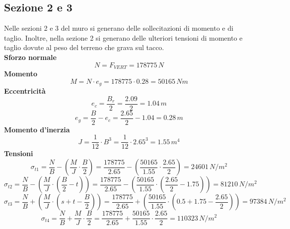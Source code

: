 \subsection{Sezione 2 e 3}
Nelle sezioni 2 e 3 del muro si generano delle sollecitazioni di momento e di taglio. Inoltre, nella sezione 2 si generano delle ulteriori tensioni di momento e taglio dovute al peso del terreno che grava sul tacco.\\
\textbf{Sforzo normale}
\begin{equation*}
    N = F_{VERT} = 178775 \,N
\end{equation*}
\textbf{Momento}
\begin{equation*}
    M = N \cdot e_g = 178775 \cdot 0.28 = 50165 \,Nm
\end{equation*}
\textbf{Eccentricità}
\begin{equation*}
    e_c = \frac{B_r}{2} = \frac{2.09}{2} = 1.04 \,m
\end{equation*}
\begin{equation*}
    e_g = \frac{B}{2} - e_c = \frac{2.65}{2} - 1.04 = 0.28\, m
\end{equation*}
\textbf{Momento d'inerzia}
\begin{equation*}
    J = \frac{1}{12} \cdot B^3 = \frac{1}{12} \cdot 2.65^3 = 1.55 \,m^4
\end{equation*}
\textbf{Tensioni}
\begin{equation*}
    \sigma_{t1} = \frac{N}{B} - \left(\frac{M}{J} \cdot \frac{B}{2}\right) = \frac{178775}{2.65} - \left(\frac{50165}{1.55} \cdot \frac{2.65}{2}\right) = 24601 \, N/m^2
\end{equation*}
\begin{equation*}
    \sigma_{t2} = \frac{N}{B} - \left(\frac{M}{J} \cdot \left(\frac{B}{2} -t\right)\right) = \frac{178775}{2.65} - \left(\frac{50165}{1.55} \cdot \left(\frac{2.65}{2} -1.75\right)\right) = 81210 \,N/m^2
\end{equation*}
\begin{equation*}
    \sigma_{t3} = \frac{N}{B} + \left(\frac{M}{J} \cdot \left(s + t - \frac{B}{2}\right)\right) = \frac{178775}{2.65} + \left(\frac{50165}{1.55} \cdot \left( 0.5+1.75 - \frac{2.65}{2} \right) \right) = 97384 \,N/m^2
\end{equation*}
\begin{equation*}
    \sigma_{t4} = \frac{N}{B} + \frac{M}{J} \cdot \frac{B}{2} = \frac{178775}{2.65} + \frac{50165}{1.55} \cdot \frac{2.65}{2}= 110323 \,N/m^2
\end{equation*}

